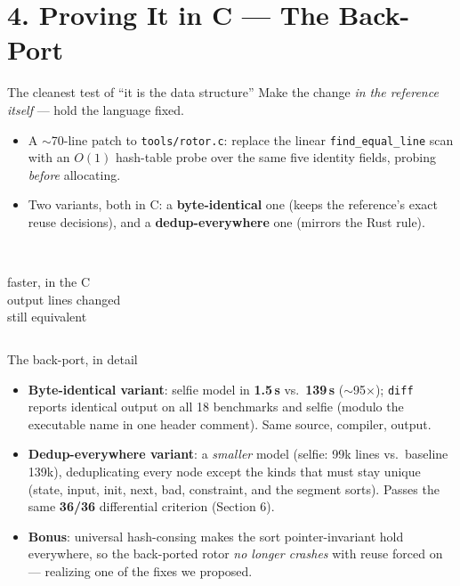 \documentclass[aspectratio=169]{beamer}
\newcommand{\bignum}[2]{{\fontsize{30}{32}\selectfont\textbf{#1}}\\[2pt]{\footnotesize\color{ink!70}#2}}
\newcommand{\key}[1]{\textbf{\color{accentdk}#1}}
\begin{document}
\section{4. Proving It in C --- The Back-Port}

\begin{frame}{The cleanest test of ``it is the data structure''}
  Make the change \emph{in the reference itself} --- hold the language fixed.
  \vspace{0.3em}
  \begin{itemize}\setlength\itemsep{0.3em}\footnotesize
    \item A $\sim$70-line patch to \texttt{tools/rotor.c}: replace the linear
          \texttt{find\_equal\_line} scan with an $O(1)$ hash-table probe over
          the same five identity fields, probing \emph{before} allocating.
    \item Two variants, both in C: a \key{byte-identical} one (keeps the
          reference's exact reuse decisions), and a \key{dedup-everywhere}
          one (mirrors the Rust rule).
  \end{itemize}
  \vfill
  \centering
  \begin{columns}[c]
    \centering\bignum{95$\times$}{faster, in the C}
    \centering\bignum{0}{output lines changed}
    \centering\bignum{36/36}{still equivalent}
  \end{columns}
\end{frame}

\begin{frame}{The back-port, in detail}
  \begin{itemize}\setlength\itemsep{0.3em}\footnotesize
    \item \key{Byte-identical variant}: selfie model in \textbf{1.5\,s} vs.\
          \textbf{139\,s} ($\sim$95$\times$); \texttt{diff} reports identical
          output on all 18 benchmarks and selfie (modulo the executable name
          in one header comment). Same source, compiler, output.
    \item \key{Dedup-everywhere variant}: a \emph{smaller} model (selfie:
          99k lines vs.\ baseline 139k), deduplicating every node except the
          kinds that must stay unique (state, input, init, next, bad,
          constraint, and the segment sorts). Passes the same \textbf{36/36}
          differential criterion (Section 6).
    \item \key{Bonus}: universal hash-consing makes the sort pointer-invariant
          hold everywhere, so the back-ported rotor \emph{no longer crashes}
          with reuse forced on --- realizing one of the fixes we proposed.
  \end{itemize}
\end{frame}
\end{document}
